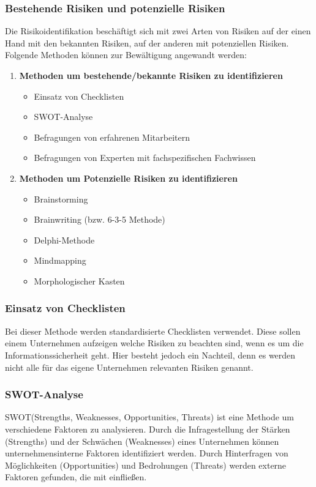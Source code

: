 \subsubsection{Bestehende Risiken und potenzielle Risiken}
Die Risikoidentifikation beschäftigt sich mit zwei Arten von Risiken auf der einen Hand mit den bekannten Risiken, auf der anderen mit potenziellen Risiken. Folgende Methoden können zur Bewältigung angewandt werden:
\begin{enumerate}
    \item \textbf{Methoden um bestehende/bekannte Risiken zu identifizieren}
    \begin{itemize}
        \item Einsatz von Checklisten
        \item SWOT-Analyse
        \item Befragungen von erfahrenen Mitarbeitern
        \item Befragungen von Experten mit fachspezifischen Fachwissen
    \end{itemize}
    \item \textbf{Methoden um Potenzielle Risiken zu identifizieren}
    \begin{itemize}
    	\item Brainstorming
    	\item Brainwriting (bzw. 6-3-5 Methode)
    	\item Delphi-Methode
    	\item Mindmapping
    	\item Morphologischer Kasten
    \end{itemize}
\end{enumerate}

\subsubsection{Einsatz von Checklisten}
Bei dieser Methode werden standardisierte Checklisten verwendet. Diese sollen einem Unternehmen aufzeigen welche Risiken zu beachten sind, wenn es um die Informationssicherheit geht. Hier besteht jedoch ein Nachteil, denn es werden nicht alle für das eigene Unternehmen relevanten Risiken genannt.

\subsubsection{SWOT-Analyse}
SWOT(Strengths, Weaknesses, Opportunities, Threats) ist eine Methode um verschiedene Faktoren zu analysieren. 
Durch die Infragestellung der Stärken (Strengths) und der Schwächen (Weaknesses) eines Unternehmen können unternehmensinterne Faktoren identifiziert werden.
Durch Hinterfragen von Möglichkeiten (Opportunities) und Bedrohungen (Threats) werden externe Faktoren gefunden, die mit einfließen.


